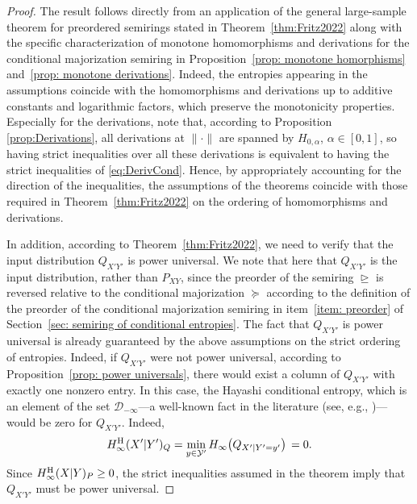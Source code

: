 \documentclass[aps,pra,11pt,onecolumn,nofootinbib,tightenlines]{revtex4-2}
\theoremstyle{definition}
\newcommand{\rgeq}{\trianglerighteq}
\begin{document}
\begin{proof}
The result follows directly from an application of the general large-sample theorem for preordered semirings stated in Theorem~\ref{thm:Fritz2022} along with the specific characterization of monotone homomorphisms and derivations for the conditional majorization semiring in Proposition~\ref{prop: monotone homorphisms} and~\ref{prop: monotone derivations}. Indeed, the entropies appearing in the assumptions coincide with the homomorphisms and derivations up to additive constants and logarithmic factors, which preserve the monotonicity properties. Especially for the derivations, note that, according to Proposition \ref{prop:Derivations}, all derivations at $\|\cdot\|$ are spanned by $H_{0,\alpha}$, $\alpha\in[0,1]$, so having strict inequalities over all these derivations is equivalent to having the strict inequalities of \eqref{eq:DerivCond}. Hence, by appropriately accounting for the direction of the inequalities, the assumptions of the theorems coincide with those required in Theorem~\ref{thm:Fritz2022} on the ordering of homomorphisms and derivations.

In addition, according to Theorem~\ref{thm:Fritz2022}, we need to verify that the input distribution $Q_{X'Y'}$ is power universal. We note that here that \(Q_{X'Y'}\) is the input distribution, rather than \(P_{XY}\), since the preorder of the semiring \(\rgeq\) is reversed relative to the conditional majorization \(\succeq\) according to the definition of the preorder of the conditional majorization semiring in item~\ref{item: preorder} of Section~\ref{sec: semiring of conditional entropies}.
The fact that $Q_{X'Y'}$ is power universal is already guaranteed by the above assumptions on the strict ordering of entropies. Indeed, if $Q_{X'Y'}$ were not power universal, according to Proposition~\ref{prop: power universals}, there would exist a column of $Q_{X'Y'}$ with exactly one nonzero entry. 
In this case, the Hayashi conditional entropy, which is an element of the set \(\mathcal{D}_{-\infty}\)—a well-known fact in the literature (see, e.g., \cite{gour2024inevitability})— would be zero for $Q_{X'Y'}$. Indeed,  
\begin{equation}
    H^{\rm{H}}_{\infty}(X'|Y')_Q = \min_{y \in \mathcal{Y}'}  H_{\infty}\bigl(Q_{X'|Y'=y'}\bigr) \, = 0.
\end{equation}
Since $ H^{\rm{H}}_{\infty}(X|Y)_P\geq0$, the strict inequalities assumed in the theorem imply that $Q_{X'Y'}$ must be power universal.
\end{proof}
\end{document}

